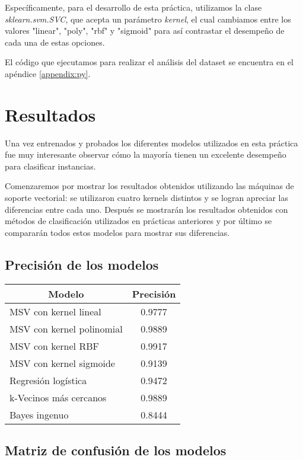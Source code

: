 \documentclass[sigconf,authorversion,nonacm]{acmart}
\begin{document}
Específicamente, para el desarrollo de esta práctica, utilizamos la clase \textit{sklearn.svm.SVC}, que acepta un parámetro \textit{kernel}, el cual cambiamos entre los valores "linear", "poly", "rbf" y "sigmoid" para así contrastar el desempeño de cada una de estas opciones.

El código que ejecutamos para realizar el análisis del dataset se encuentra en el apéndice \ref{appendix:py}.


\section{Resultados}
Una vez entrenados y probados los diferentes modelos utilizados en esta práctica fue muy interesante observar cómo la mayoría tienen un excelente desempeño para clasificar instancias.

Comenzaremos por mostrar los resultados obtenidos utilizando las máquinas de soporte vectorial: se utilizaron cuatro kernels distintos y se logran apreciar las diferencias entre cada uno. Después se mostrarán los resultados obtenidos con métodos de clasificación utilizados en prácticas anteriores y por último se compararán todos estos modelos para mostrar sus diferencias.

\subsection{Precisión de los modelos}
\begin{table}[H]
\begin{tabular}{|l|c|}
\hline
\multicolumn{1}{|c|}{\textbf{Modelo}} & \textbf{Precisión} \\ \hline
MSV con kernel lineal     & 0.9777    \\ \hline
MSV con kernel polinomial & 0.9889    \\ \hline
MSV con kernel RBF        & 0.9917    \\ \hline
MSV con kernel sigmoide   & 0.9139    \\ \hline
Regresión logística       & 0.9472    \\ \hline
k-Vecinos más cercanos    & 0.9889     \\ \hline
Bayes ingenuo             & 0.8444    \\ \hline
\end{tabular}
\end{table}

\subsection{Matriz de confusión de los modelos}
\end{document}
